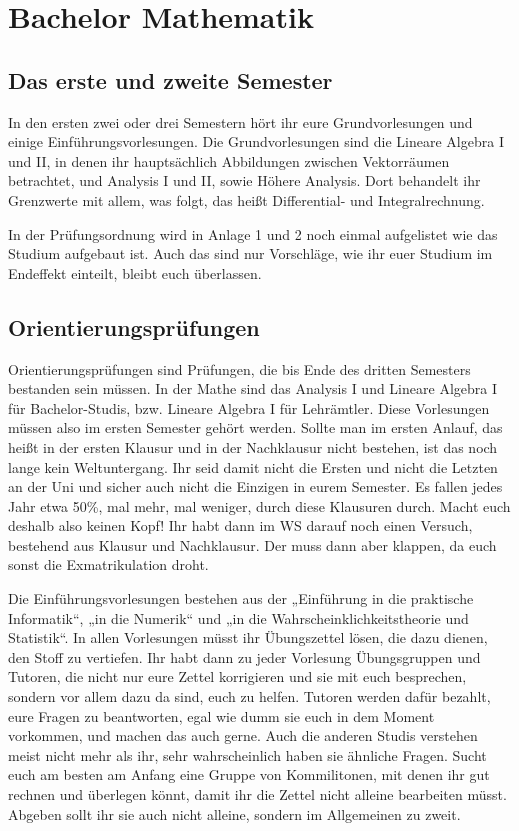 \section{Bachelor Mathematik}


\subsection{Das erste und zweite Semester}

In den ersten zwei oder drei Semestern hört ihr eure Grundvorlesungen und einige Einführungsvorlesungen. Die Grundvorlesungen sind die Lineare Algebra I und II, in denen ihr hauptsächlich Abbildungen zwischen Vektorräumen betrachtet, und Analysis I und II, sowie Höhere Analysis. Dort behandelt ihr Grenzwerte mit allem, was folgt, das heißt Differential- und Integralrechnung.

In der Prüfungsordnung wird in Anlage 1 und 2 noch einmal aufgelistet wie das Studium aufgebaut ist. Auch das sind nur Vorschläge, wie ihr euer Studium im Endeffekt einteilt, bleibt euch überlassen.

\subsection{Orientierungsprüfungen}

Orientierungsprüfungen sind Prüfungen, die bis Ende des dritten Semesters bestanden sein müssen. In der Mathe sind das Analysis I und Lineare Algebra I für Bachelor-Studis, bzw. Lineare Algebra I für Lehrämtler.  Diese Vorlesungen müssen also im ersten Semester gehört werden.  Sollte man im ersten Anlauf, das heißt in der ersten Klausur und in der Nachklausur nicht bestehen, ist das noch lange kein Weltuntergang. Ihr seid damit nicht die Ersten und nicht die Letzten an der Uni und sicher auch nicht die Einzigen in eurem Semester.  Es fallen jedes Jahr etwa 50\%, mal mehr, mal weniger, durch diese Klausuren durch. Macht euch deshalb also keinen Kopf! Ihr habt dann im WS darauf noch einen Versuch, bestehend aus Klausur und Nachklausur. Der muss dann aber klappen, da euch sonst die Exmatrikulation droht.

Die Einführungsvorlesungen bestehen aus der „Einführung in die praktische Informatik“, „in die Numerik“ und „in die Wahrscheinklichkeitstheorie und Statistik“.  In allen Vorlesungen müsst ihr Übungszettel lösen, die dazu dienen, den Stoff zu vertiefen.  Ihr habt dann zu jeder Vorlesung Übungsgruppen und Tutoren, die nicht nur eure Zettel korrigieren und sie mit euch besprechen, sondern vor allem dazu da sind, euch zu helfen.  Tutoren werden dafür bezahlt, eure Fragen zu beantworten, egal wie dumm sie euch in dem Moment vorkommen, und machen das auch gerne.  Auch die anderen Studis verstehen meist nicht mehr als ihr, sehr wahrscheinlich haben sie ähnliche Fragen.  Sucht euch am besten am Anfang eine Gruppe von Kommilitonen, mit denen ihr gut rechnen und überlegen könnt, damit ihr die Zettel nicht alleine bearbeiten müsst. Abgeben sollt ihr sie auch nicht alleine, sondern im Allgemeinen zu zweit.

